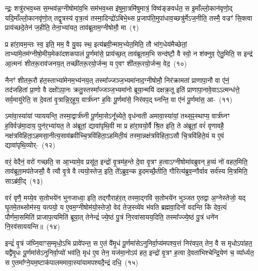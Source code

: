 न्द्रः॒ शत्रु॑रभव॒थ्स स॒म्भव॑न्न॒ग्नी\-षोमा॑व॒भि सम॑भव॒थ्स इ॑षुमा॒त्रमि॑षुमात्रं॒ विष्व॑ङ्ङवर्धत॒ स इ॒माँल्लो॒कान॑वृणो॒द् यदि॒माँल्लो॒का\-नवृ॑णो॒त् तद्वृ॒त्रस्य॑ वृत्र॒त्वं तस्मा॒दिन्द्रो॑\-ऽबिभे॒थ्स प्र॒जा\-प॑ति॒मुपा॑\-धाव॒च्छत्रु॑र्मे\-ऽज॒नीति॒ तस्मै॒ वज्रꣳ॑ सि॒क्त्वा प्राय॑च्छदे॒तेन॑ ज॒हीति॒ तेना॒भ्या॑यत॒ ताव॑ब्रूताम॒ग्नी\-षोमौ॒ मा~(९)

प्र हा॑रा॒वम॒न्तः स्व॒ इति॒ मम॒ वै यु॒वꣴ स्थ॒ इत्य॑ब्रवी॒न्माम॒भ्ये\-त॒मिति॒ तौ भा॑ग॒धेय॑मैच्छेतां॒ ताभ्या॑मे॒त\-म॑ग्नीषो॒मीय॒\-मेका॑\-दश\-कपालं पू॒र्णमा॑से॒ प्राय॑च्छ॒त् ताव॑ब्रूताम॒भि सन्द॑ष्टौ॒ वै स्वो॒ न श॑क्नुव॒ ऐतु॒मिति॒ स इन्द्र॑ आ॒त्मनः॑ शीतरू॒राव॑जनय॒त् तच्छी॑तरू॒रयो॒र्जन्म॒ य ए॒वꣳ शी॑तरू॒रयो॒र्जन्म॒ वेद॒~(१०)


नैनꣳ॑ शीतरू॒रौ ह॑त॒स्ताभ्या॑मेनम॒भ्य॑नय॒त् तस्मा᳚ज्जञ्ज॒भ्यमा॑\-नाद॒ग्नी\-षोमौ॒ निर॑क्रामतां प्राणापा॒नौ वा ए॑नं॒ तद॑जहितां प्रा॒णो वै दक्षो॑\-ऽपा॒नः क्रतु॒स्तस्मा᳚ज्जञ्ज॒भ्यमा॑नो ब्रूया॒न्मयि॑ दक्षक्र॒तू इति॑ प्राणापा॒नावे॒वा\-ऽऽ\-त्मन्ध॑त्ते॒ सर्व॒मायु॑रेति॒ स दे॒वता॑ वृ॒त्रान्नि॒र्॒\mbox{}हूय॒ वार्त्र॑घ्नꣳ ह॒विः पू॒र्णमा॑से॒ निर॑वप॒द् घ्नन्ति॒ वा ए॑नं पू॒र्णमा॑स॒ आ-~(११)

ऽमा॑वा॒स्या॑यां प्याययन्ति॒ तस्मा॒द्वार्त्र॑घ्नी पू॒र्णमा॒से\-ऽनू᳚च्येते॒ वृध॑न्वती अमावा॒स्या॑यां॒ तथ्स॒ꣴ॒स्थाप्य॒ वार्त्र॑घ्नꣳ ह॒विर्वज्र॑मा॒दाय॒ पुन॑र॒भ्या॑यत॒ ते अ॑ब्रूतां॒ द्यावा॑पृथि॒वी मा प्र हा॑रा॒वयो॒र्वै श्रि॒त इति॒ ते अ॑ब्रूतां॒ वरं॑ वृणावहै॒ नक्ष॑त्रविहिता॒\-ऽहमसा॒नीत्य॒साव॑ब्रवीच्चि॒त्रवि॑हिता॒\-ऽहमिती॒यं तस्मा॒न्नक्ष॑त्रविहिता॒\-ऽसौ चि॒त्रवि॑हिते॒यं य ए॒वं द्यावा॑पृथि॒व्योर्-~(१२)

वरं॒ वेदैनं॒ वरो॑ गच्छति॒ स आ॒भ्यामे॒व प्रसू॑त॒ इन्द्रो॑ वृ॒त्रम॑ह॒न्ते दे॒वा वृ॒त्रꣳ ह॒त्वा\-ऽग्नी\-षोमा॑वब्रुवन् ह॒व्यं नो॑ वहत॒मिति॒ ताव॑ब्रूता॒मप॑तेजसौ॒ वै त्यौ वृ॒त्रे वै त्ययो॒स्तेज॒ इति॒ ते᳚\-ऽब्रुव॒न्क इ॒दमच्छै॒तीति॒ गौरित्य॑ब्रुव॒न्गौर्वाव सर्व॑स्य मि॒त्रमिति॒ सा\-ऽब्र॑वी॒द्~(१३)

वरं॑ वृणै॒ मय्ये॒व स॒तोभये॑न भुनजाध्वा॒ इति॒ तद्गौराह॑र॒त् तस्मा॒द्गवि॑ स॒तोभये॑न भुञ्जत ए॒तद्वा अ॒ग्नेस्तेजो॒ यद् घृ॒तमे॒तथ्सोम॑स्य॒ यत्पयो॒ य ए॒वम॒ग्नी\-षोम॑यो॒स्तेजो॒ वेद॑ तेज॒स्व्ये॑व भ॑वति ब्रह्मवा॒दिनो॑ वदन्ति किं देव॒त्यं॑ पौर्णमा॒समिति॑ प्राजाप॒त्यमिति॑ ब्रूया॒त् तेनेन्द्रं॑ ज्ये॒ष्ठं पु॒त्रं नि॒रवा॑सायय॒दिति॒ तस्मा᳚ज्ज्ये॒ष्ठं पु॒त्रं धने॑न नि॒रव॑साययन्ति॥~(१४)

{\anuvakamend[{अ॒स्य॒ मा वेदा द्यावा॑पृथि॒व्योर॑ब्रवी॒दिति॒ तस्मा᳚च्च॒त्वारि॑ च}]}%

इन्द्रं॑ वृ॒त्रं ज॑घ्नि॒वाꣳस॒म्मृधो॒\-ऽभि प्रावे॑पन्त॒ स ए॒तं वै॑मृ॒धं पू॒र्णमा॑से\-ऽनुनिर्वा॒प्य॑मपश्य॒त्तं निर॑वप॒त् तेन॒ वै स मृधो\-ऽपा॑हत॒ यद्वै॑मृ॒धः पू॒र्णमा॑से\-ऽनुनिर्वा॒प्यो॑ भव॑ति॒ मृध॑ ए॒व तेन॒ यज॑मा॒नो\-ऽप॑ हत॒ इन्द्रो॑ वृ॒त्रꣳ ह॒त्वा दे॒वता॑भिश्चेन्द्रि॒येण॑ च॒ व्या᳚र्ध्यत॒ स ए॒तमा᳚ग्ने॒यम॒ष्टाक॑पालममावा॒स्या॑यामपश्यदै॒न्द्रं दधि॒~(१५)


